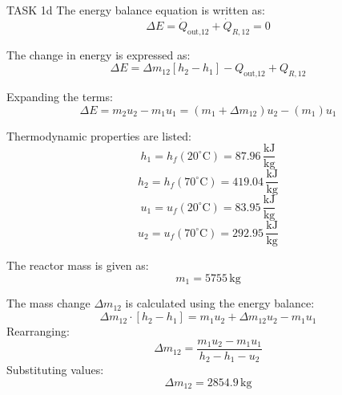 TASK 1d  
The energy balance equation is written as:  
\[
\Delta E = \dot{Q}_{\text{out,12}} + \dot{Q}_{R,12} = 0
\]  

The change in energy is expressed as:  
\[
\Delta E = \Delta m_{12} \left[ h_2 - h_1 \right] - Q_{\text{out,12}} + Q_{R,12}
\]  

Expanding the terms:  
\[
\Delta E = m_2 u_2 - m_1 u_1 = (m_1 + \Delta m_{12}) u_2 - (m_1) u_1
\]  

Thermodynamic properties are listed:  
\[
h_1 = h_f(20^\circ\text{C}) = 87.96 \, \frac{\text{kJ}}{\text{kg}}
\]  
\[
h_2 = h_f(70^\circ\text{C}) = 419.04 \, \frac{\text{kJ}}{\text{kg}}
\]  
\[
u_1 = u_f(20^\circ\text{C}) = 83.95 \, \frac{\text{kJ}}{\text{kg}}
\]  
\[
u_2 = u_f(70^\circ\text{C}) = 292.95 \, \frac{\text{kJ}}{\text{kg}}
\]  

The reactor mass is given as:  
\[
m_1 = 5755 \, \text{kg}
\]  

The mass change \( \Delta m_{12} \) is calculated using the energy balance:  
\[
\Delta m_{12} \cdot \left[ h_2 - h_1 \right] = m_1 u_2 + \Delta m_{12} u_2 - m_1 u_1
\]  
Rearranging:  
\[
\Delta m_{12} = \frac{m_1 u_2 - m_1 u_1}{h_2 - h_1 - u_2}
\]  
Substituting values:  
\[
\Delta m_{12} = 2854.9 \, \text{kg}
\]  